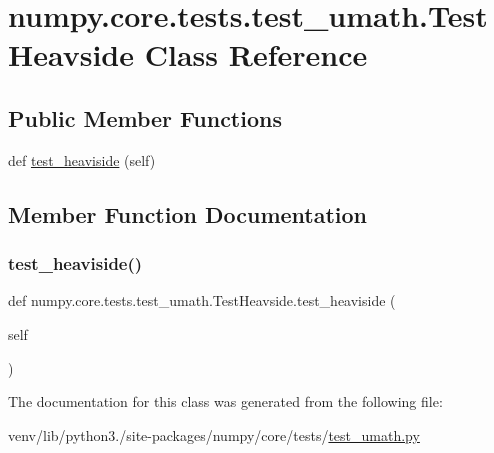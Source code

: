 \hypertarget{classnumpy_1_1core_1_1tests_1_1test__umath_1_1TestHeavside}{}\section{numpy.\+core.\+tests.\+test\+\_\+umath.\+Test\+Heavside Class Reference}
\label{classnumpy_1_1core_1_1tests_1_1test__umath_1_1TestHeavside}
\subsection*{Public Member Functions}
\begin{DoxyCompactItemize}
\item 
def \hyperlink{classnumpy_1_1core_1_1tests_1_1test__umath_1_1TestHeavside_a4c3973424ef9035332ca250e476507c5}{test\+\_\+heaviside} (self)
\end{DoxyCompactItemize}


\subsection{Member Function Documentation}
\mbox{\label{classnumpy_1_1core_1_1tests_1_1test__umath_1_1TestHeavside_a4c3973424ef9035332ca250e476507c5}} 
\subsubsection{\texorpdfstring{test\+\_\+heaviside()}{test\_heaviside()}}
{\footnotesize\ttfamily def numpy.\+core.\+tests.\+test\+\_\+umath.\+Test\+Heavside.\+test\+\_\+heaviside (\begin{DoxyParamCaption}\item[{}]{self }\end{DoxyParamCaption})}



The documentation for this class was generated from the following file\+:\begin{DoxyCompactItemize}
\item 
venv/lib/python3./site-\/packages/numpy/core/tests/\hyperlink{test__umath_8py}{test\+\_\+umath.\+py}\end{DoxyCompactItemize}
